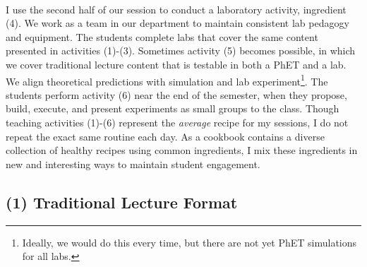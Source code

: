 \documentclass[../../../main.tex]{subfiles}
\begin{document}
\\
\vspace{0.25cm}
I use the second half of our session to conduct a laboratory activity, ingredient (4).  We work as a team in our department to maintain consistent lab pedagogy and equipment.  The students complete labs that cover the same content presented in activities (1)-(3).  Sometimes activity (5) becomes possible, in which we cover traditional lecture content that is testable in both a PhET and a lab.  We align theoretical predictions with simulation and lab experiment\footnote{Ideally, we would do this every time, but there are not yet PhET simulations for all labs.}.  The students perform activity (6) near the end of the semester, when they propose, build, execute, and present experiments as small groups to the class.  Though teaching activities (1)-(6) represent the \textit{average} recipe for my sessions, I do not repeat the exact same routine each day.  As a cookbook contains a diverse collection of healthy recipes using common ingredients, I mix these ingredients in new and interesting ways to maintain student engagement.

\subsection{(1) Traditional Lecture Format}
\end{document}
